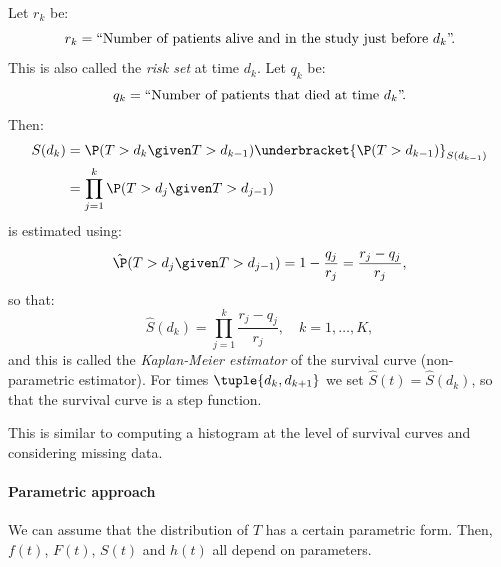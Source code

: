 Let $r_k$ be:
\begin{equation}
    r_k = \text{``Number of patients alive and in the study just before $d_k$''}\negthinspace.
\end{equation}
This is also called the \emph{risk set} at time $d_k$. Let $q_k$ be:
\begin{equation}
    q_k = \text{``Number of patients that died at time $d_k$''}\negthinspace.
\end{equation}
Then:
\begin{equation}
    \begin{aligned}
        S(d_k) & = \P(T > d_k \given T > d_{k-1}) \underbracket{\P(T > d_{k-1})}_{S(d_{k-1})} \\
               & = \prod_{j=1}^k \P(T > d_j \given T > d_{j-1})                               \\
    \end{aligned}
\end{equation}
is estimated using:
\begin{equation}
    \hat{\P}(T > d_j \given T > d_{j-1}) = 1 - \frac{q_j}{r_j} = \frac{r_j - q_j}{r_j},
\end{equation}
so that:
\begin{equation}
    \hat{S}(d_k) = \prod_{j=1}^k \frac{r_j - q_j}{r_j}, \quad k = 1, \ldots, K,
\end{equation}
and this is called the \emph{Kaplan-Meier estimator} of the survival curve (non-parametric estimator). For times $\tuple{d_k, d_{k+1}}$ we set $\hat{S}(t) = \hat{S}(d_k)$, so that the survival curve is a step function.

\begin{observation}
    This is similar to computing a histogram at the level of survival curves and considering missing data.
\end{observation}

\paragraph{Parametric approach}

We can assume that the distribution of $T$ has a certain parametric form. Then, $f(t)$, $F(t)$, $S(t)$ and $h(t)$ all depend on parameters.

